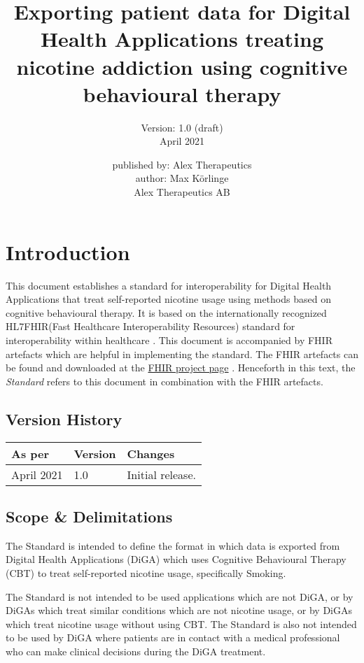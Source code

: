 \documentclass{report}
\title{Exporting patient data for Digital Health Applications treating nicotine addiction using cognitive behavioural therapy \vspace{2cm}}
\author{Version: 1.0 (draft) \\ April 2021 \\ \vspace{6cm}}
\date{published by: Alex Therapeutics \\ author: Max Körlinge \\ \textcopyright  Alex Therapeutics AB}
\newcommand{\fhir}{FHIR\textsuperscript{\textregistered}}
\newcommand{\hl}{HL7\textsuperscript{\textregistered}}
\begin{document}
\maketitle
\tableofcontents

\chapter{Introduction}
\label{ch:intro}

This document establishes a standard for interoperability for Digital Health Applications that treat self-reported nicotine usage using methods based on cognitive behavioural therapy. It is based on the internationally recognized \hl \fhir (Fast Healthcare Interoperability Resources) standard for interoperability 
within healthcare \cite{FHIR}. This document is accompanied by FHIR artefacts which are helpful in implementing the standard. The FHIR artefacts can be found and downloaded at the \href{https://simplifier.net/treat-nicotine-usage-diga}{FHIR project page} \cite{project}.
Henceforth in this text, the \textit{Standard} refers to this document in combination with the FHIR artefacts.

\section{Version History}
\begin{table}[H]
    \begin{tabular}{@{}lll@{}}
    \textbf{As per}                 & \textbf{Version}         & \textbf{Changes} \\ \midrule
    \multicolumn{1}{l|}{April 2021} & \multicolumn{1}{l|}{1.0} & Initial release. \\ \bottomrule
    \end{tabular}
    \label{tab:version}
    \end{table}

\section{Scope \& Delimitations}

The Standard is intended to define the format in which data is exported from Digital Health Applications (DiGA) which uses Cognitive Behavioural Therapy (CBT) to treat self-reported nicotine usage, specifically Smoking.

The Standard is not intended to be used applications which are not DiGA, or by DiGAs which treat similar conditions which are not nicotine usage, or by DiGAs which treat nicotine usage without using CBT. 
The Standard is also not intended to be used by DiGA where patients are in contact with a medical professional who can make clinical decisions during the DiGA treatment.
\end{document}
